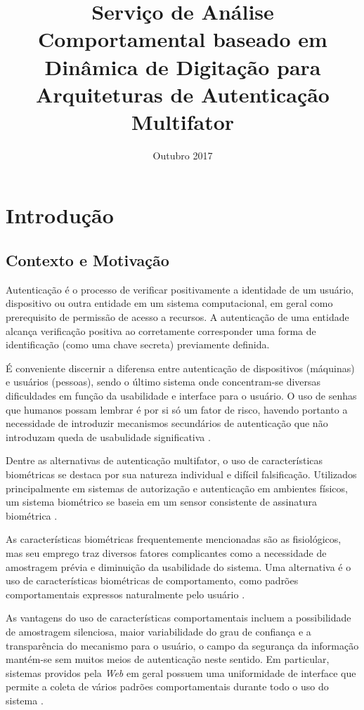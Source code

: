 \documentclass[pfc]{imetex}
\title{Serviço de Análise Comportamental baseado em Dinâmica de Digitação para Arquiteturas de Autenticação Multifator}
\date{Outubro 2017}
\begin{document}
\chapter{Introdução}

\section{Contexto e Motivação}
Autenticação é o processo de verificar positivamente a identidade de um usuário, dispositivo ou outra entidade em um sistema computacional, em geral como prerequisito de permissão de acesso a recursos. A autenticação de uma entidade alcança verificação positiva ao corretamente corresponder uma forma de identificação (como uma chave secreta) previamente definida. \cite{OGorman2003}

É conveniente discernir a diferensa entre autenticação de dispositivos (máquinas) e usuários (pessoas), sendo o último sistema onde concentram-se diversas dificuldades em função da usabilidade e interface para o usuário. \cite{OGorman2003} O uso de senhas que humanos possam lembrar é por si só um fator de risco, havendo portanto a necessidade de introduzir mecanismos secundários de autenticação que não introduzam queda de usabulidade significativa \cite{Morris1979}.


Dentre as alternativas de autenticação multifator, o uso de características biométricas se destaca por sua natureza individual e difícil falsificação. Utilizados principalmente em sistemas de autorização e autenticação em ambientes físicos, um sistema biométrico se baseia em um sensor consistente de assinatura biométrica \cite{EdDawson2003}.

As características biométricas frequentemente mencionadas são as fisiológicos, mas seu emprego traz diversos fatores complicantes como a necessidade de amostragem prévia e diminuição da usabilidade do sistema. Uma alternativa é o uso de características biométricas de comportamento, como padrões comportamentais expressos naturalmente pelo usuário \cite{Moskovitch2009}.

As vantagens do uso de características comportamentais incluem a possibilidade de amostragem silenciosa, maior variabilidade do grau de confiança e a transparência do mecanismo para o usuário, o campo da segurança da informação mantém-se sem muitos meios de autenticação neste sentido. Em particular, sistemas providos pela \textit{Web} em geral possuem uma uniformidade de interface que permite a coleta de vários padrões comportamentais durante todo o uso do sistema \cite{Moskovitch2009}.	
\end{document}
